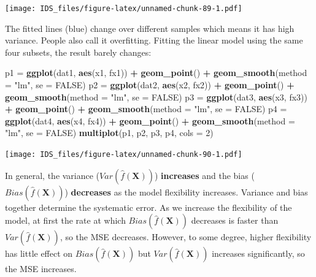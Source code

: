 \documentclass[12pt,]{krantz}
\newenvironment{Shaded}{\begin{snugshade}}{\end{snugshade}}
\newcommand{\KeywordTok}[1]{\textcolor[rgb]{0.13,0.29,0.53}{\textbf{#1}}}
\newcommand{\DataTypeTok}[1]{\textcolor[rgb]{0.13,0.29,0.53}{#1}}
\newcommand{\DecValTok}[1]{\textcolor[rgb]{0.00,0.00,0.81}{#1}}
\newcommand{\StringTok}[1]{\textcolor[rgb]{0.31,0.60,0.02}{#1}}
\newcommand{\OtherTok}[1]{\textcolor[rgb]{0.56,0.35,0.01}{#1}}
\newcommand{\OperatorTok}[1]{\textcolor[rgb]{0.81,0.36,0.00}{\textbf{#1}}}
\newcommand{\NormalTok}[1]{#1}
\theoremstyle{definition}
\theoremstyle{definition}
\theoremstyle{definition}
\theoremstyle{remark}
\begin{document}
\texttt{[image: IDS\_files/figure-latex/unnamed-chunk-89-1.pdf]}

The fitted lines (blue) change over different samples which means it has
high variance. People also call it overfitting. Fitting the linear model
using the same four subsets, the result barely changes:

\begin{Shaded}
\begin{Highlighting}[]
\NormalTok{p1 =}\StringTok{ }\KeywordTok{ggplot}\NormalTok{(dat1, }\KeywordTok{aes}\NormalTok{(x1, fx1)) }\OperatorTok{+}\StringTok{ }\KeywordTok{geom_point}\NormalTok{() }\OperatorTok{+}\StringTok{ }\KeywordTok{geom_smooth}\NormalTok{(}\DataTypeTok{method =} \StringTok{"lm"}\NormalTok{, }
    \DataTypeTok{se =} \OtherTok{FALSE}\NormalTok{)}
\NormalTok{p2 =}\StringTok{ }\KeywordTok{ggplot}\NormalTok{(dat2, }\KeywordTok{aes}\NormalTok{(x2, fx2)) }\OperatorTok{+}\StringTok{ }\KeywordTok{geom_point}\NormalTok{() }\OperatorTok{+}\StringTok{ }\KeywordTok{geom_smooth}\NormalTok{(}\DataTypeTok{method =} \StringTok{"lm"}\NormalTok{, }
    \DataTypeTok{se =} \OtherTok{FALSE}\NormalTok{)}
\NormalTok{p3 =}\StringTok{ }\KeywordTok{ggplot}\NormalTok{(dat3, }\KeywordTok{aes}\NormalTok{(x3, fx3)) }\OperatorTok{+}\StringTok{ }\KeywordTok{geom_point}\NormalTok{() }\OperatorTok{+}\StringTok{ }\KeywordTok{geom_smooth}\NormalTok{(}\DataTypeTok{method =} \StringTok{"lm"}\NormalTok{, }
    \DataTypeTok{se =} \OtherTok{FALSE}\NormalTok{)}
\NormalTok{p4 =}\StringTok{ }\KeywordTok{ggplot}\NormalTok{(dat4, }\KeywordTok{aes}\NormalTok{(x4, fx4)) }\OperatorTok{+}\StringTok{ }\KeywordTok{geom_point}\NormalTok{() }\OperatorTok{+}\StringTok{ }\KeywordTok{geom_smooth}\NormalTok{(}\DataTypeTok{method =} \StringTok{"lm"}\NormalTok{, }
    \DataTypeTok{se =} \OtherTok{FALSE}\NormalTok{)}
\KeywordTok{multiplot}\NormalTok{(p1, p2, p3, p4, }\DataTypeTok{cols =} \DecValTok{2}\NormalTok{)}
\end{Highlighting}
\end{Shaded}

\texttt{[image: IDS\_files/figure-latex/unnamed-chunk-90-1.pdf]}

In general, the variance (\(Var(\hat{f}(\mathbf{X}))\))
\textbf{increases} and the bias (\(Bias(\hat{f}(\mathbf{X}))\))
\textbf{decreases} as the model flexibility increases. Variance and bias
together determine the systematic error. As we increase the flexibility
of the model, at first the rate at which \(Bias(\hat{f}(\mathbf{X}))\)
decreases is faster than \(Var (\hat{f} (\mathbf{X}))\), so the MSE
decreases. However, to some degree, higher flexibility has little effect
on \(Bias(\hat{f}(\mathbf{X}))\) but \(Var(\hat{f} (\mathbf{X}))\)
increases significantly, so the MSE increases.
\end{document}
